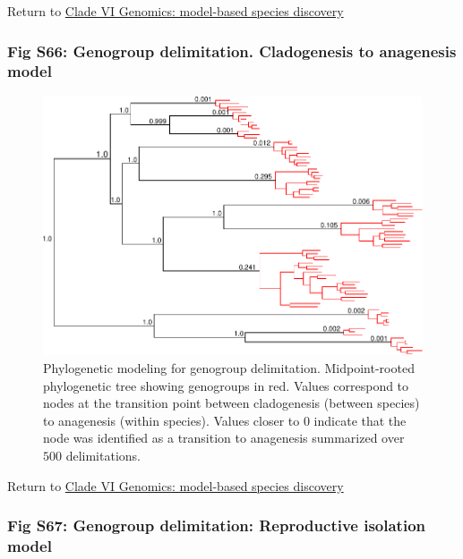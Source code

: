 \documentclass[
  11pt,
]{article}
\begin{document}
Return to \protect\hyperlink{model-based-species-discovery-11}{Clade VI Genomics: model-based species discovery}
\pagebreak

\hypertarget{fig-s66-genogroup-delimitation.-cladogenesis-to-anagenesis-model}{%
\subsubsection{Fig S66: Genogroup delimitation. Cladogenesis to anagenesis model}\label{fig-s66-genogroup-delimitation.-cladogenesis-to-anagenesis-model}}

\begin{figure}
\includegraphics[height=.6\textwidth,]{Supplementary_Material_files/figure-latex/cladeVImolecularDelimitationsPhylogeny2-1} \caption{Phylogenetic modeling for genogroup delimitation. Midpoint-rooted phylogenetic tree showing genogroups in red. Values correspond to nodes at the transition point between cladogenesis (between species) to anagenesis (within species). Values closer to 0 indicate that the node was identified as a transition to anagenesis summarized over $500$ delimitations.}\label{fig:cladeVImolecularDelimitationsPhylogeny2}
\end{figure}

Return to \protect\hyperlink{model-based-species-discovery-11}{Clade VI Genomics: model-based species discovery}
\pagebreak

\hypertarget{fig-s67-genogroup-delimitation-reproductive-isolation-model}{%
\subsubsection{Fig S67: Genogroup delimitation: Reproductive isolation model}\label{fig-s67-genogroup-delimitation-reproductive-isolation-model}}
\end{document}
